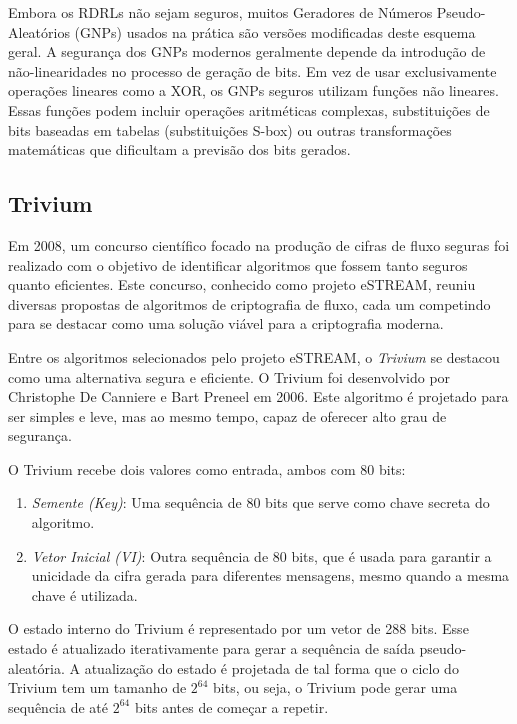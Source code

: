 Embora os RDRLs não sejam seguros, muitos Geradores de Números Pseudo-Aleatórios (GNPs) usados na prática são versões modificadas deste esquema geral.
A segurança dos GNPs modernos geralmente depende da introdução de não-linearidades no processo de geração de bits.
Em vez de usar exclusivamente operações lineares como a XOR, os GNPs seguros utilizam funções não lineares.
Essas funções podem incluir operações aritméticas complexas, substituições de bits baseadas em tabelas (substituições S-box) ou outras transformações matemáticas que dificultam a previsão dos bits gerados.

\subsection{Trivium}
\label{sec:trivium}

Em 2008, um concurso científico focado na produção de cifras de fluxo seguras foi realizado com o objetivo de identificar algoritmos que fossem tanto seguros quanto eficientes.
Este concurso, conhecido como projeto eSTREAM, reuniu diversas propostas de algoritmos de criptografia de fluxo, cada um competindo para se destacar como uma solução viável para a criptografia moderna.

Entre os algoritmos selecionados pelo projeto eSTREAM, o {\em Trivium} \cite{DeCanniere06} se destacou como uma alternativa segura e eficiente.
O Trivium foi desenvolvido por Christophe De Canniere e Bart Preneel em 2006.
Este algoritmo é projetado para ser simples e leve, mas ao mesmo tempo, capaz de oferecer alto grau de segurança.

O Trivium recebe dois valores como entrada, ambos com 80 bits:
\begin{enumerate}
\item {\em Semente (Key)}: Uma sequência de 80 bits que serve como chave secreta do algoritmo.
\item {\em Vetor Inicial (VI)}: Outra sequência de 80 bits, que é usada para garantir a unicidade da cifra gerada para diferentes mensagens, mesmo quando a mesma chave é utilizada.
\end{enumerate}

O estado interno do Trivium é representado por um vetor de 288 bits.
Esse estado é atualizado iterativamente para gerar a sequência de saída pseudo-aleatória.
A atualização do estado é projetada de tal forma que o ciclo do Trivium tem um tamanho de $2^{64}$ bits, ou seja, o Trivium pode gerar uma sequência de até $2^{64}$ bits antes de começar a repetir.

